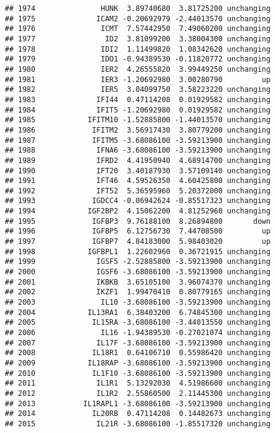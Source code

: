 \documentclass[]{article}
\begin{document}
\begin{verbatim}
## 1974               HUNK  3.89740680  3.81725200 unchanging
## 1975              ICAM2 -0.20692979 -2.44013570 unchanging
## 1976               ICMT  7.57442950  7.49060200 unchanging
## 1977                ID2  3.81099200  3.38004300 unchanging
## 1978               IDI2  1.11499820  1.08342620 unchanging
## 1979               IDO1 -0.94389530 -0.11820772 unchanging
## 1980               IER2  4.26555820  3.99449250 unchanging
## 1981               IER3 -1.20692980  3.00280790         up
## 1982               IER5  3.04099750  3.58223220 unchanging
## 1983              IFI44  0.47114208  0.01929582 unchanging
## 1984              IFIT5 -1.20692980  0.01929582 unchanging
## 1985            IFITM10 -1.52885800 -1.44013570 unchanging
## 1986             IFITM2  3.56917430  3.80779200 unchanging
## 1987             IFITM5 -3.68086100 -3.59213900 unchanging
## 1988              IFNA6 -3.68086100 -3.59213900 unchanging
## 1989              IFRD2  4.41950940  4.68914700 unchanging
## 1990              IFT20  3.40187930  3.57109140 unchanging
## 1991              IFT46  4.59526350  4.60425800 unchanging
## 1992              IFT52  5.36595960  5.20372000 unchanging
## 1993             IGDCC4 -0.06942624 -0.85517323 unchanging
## 1994            IGF2BP2  4.15062200  4.81252960 unchanging
## 1995             IGFBP3  9.76188100  8.26894800       down
## 1996             IGFBP5  6.12756730  7.44708500         up
## 1997             IGFBP7  4.84183000  5.98403020         up
## 1998            IGFBPL1  1.22602960  0.36721915 unchanging
## 1999              IGSF5 -2.52885800 -3.59213900 unchanging
## 2000              IGSF6 -3.68086100 -3.59213900 unchanging
## 2001              IKBKB  3.65105100  3.96074370 unchanging
## 2002              IKZF1  1.99470410  0.80779165 unchanging
## 2003               IL10 -3.68086100 -3.59213900 unchanging
## 2004            IL13RA1  6.38403200  6.74845300 unchanging
## 2005             IL15RA -3.68086100 -3.44013550 unchanging
## 2006               IL16 -1.94389530 -0.27021074 unchanging
## 2007              IL17F -3.68086100 -3.59213900 unchanging
## 2008             IL18R1  0.64106710  0.55986420 unchanging
## 2009            IL18RAP -3.68086100 -3.59213900 unchanging
## 2010             IL1F10 -3.68086100 -3.59213900 unchanging
## 2011              IL1R1  5.13292030  4.51986600 unchanging
## 2012              IL1R2  2.55860500  2.11445300 unchanging
## 2013           IL1RAPL1 -3.68086100 -3.59213900 unchanging
## 2014             IL20RB  0.47114208  0.14482673 unchanging
## 2015              IL21R -3.68086100 -1.85517320 unchanging

\end{verbatim}
\end{document}
